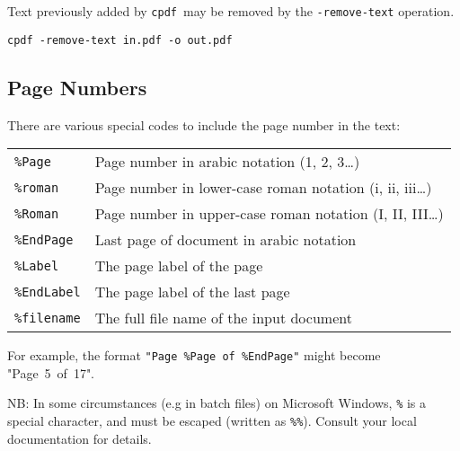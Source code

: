 \documentclass{book}
\newcommand{\cpdf}{\texttt{cpdf}}
\begin{document}
  Text previously added by \cpdf\ may be removed by the \texttt{-remove-text} operation.
  \begin{framed}
    \small\verb!cpdf -remove-text in.pdf -o out.pdf!
  \end{framed}

  \subsection{Page Numbers}
  There are various special codes to include the page number in the text:

  \vspace{2mm}
  \begin{tabular}{ll}
    \texttt{\%Page} & Page number in arabic notation (1, 2, 3\ldots) \\
    \texttt{\%roman} & Page number in lower-case roman notation (i, ii, iii\ldots) \\
    \texttt{\%Roman} & Page number in upper-case roman notation (I, II, III\ldots) \\
    \texttt{\%EndPage} & Last page of document in arabic notation \\
    \texttt{\%Label} & The page label of the page \\
    \texttt{\%EndLabel} & The page label of the last page \\
    \texttt{\%filename} & The full file name of the input document \\
  \end{tabular}

  \vspace{2mm}
  \noindent For example, the format \texttt{"Page~\%Page~of~\%EndPage"} might become "Page~5~of~17".

  NB: In some circumstances (e.g in batch files) on Microsoft Windows, \verb!%! is a special character, and must be escaped (written as \verb$%%$). Consult your local documentation for details.
\end{document}
